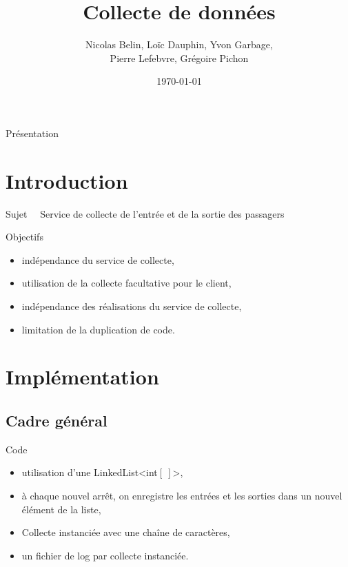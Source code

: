 \documentclass{beamer}
\title[Projet de programmation orientée objet]{Collecte de données}
\author[Les Manchots]{Nicolas Belin, Loïc Dauphin, Yvon Garbage, \\ Pierre Lefebvre, Grégoire Pichon}
\institute[ENSEIRB-MATMECA]{ENSEIRB-MATMECA}
\date{\today}
\begin{document}
\setlength{\unitlength}{1cm}

\begin{frame}{Présentation}

\titlepage

\end{frame}


\section*{Introduction}
\begin{frame}
\begin{block}{Sujet}
~~Service de collecte de l'entrée et de la sortie des passagers\\
\end{block}

\begin{block}{Objectifs}
\begin{center}
\begin{itemize}
  \item{indépendance du service de collecte,}
  \item{utilisation de la collecte facultative pour le client,}
  \item{indépendance des réalisations du service de collecte,}
  \item{limitation de la duplication de code.}
\end{itemize}
\end{center}
\end{block}
\end{frame}

\section{Implémentation}
\subsection{Cadre général}
\begin{frame}
\begin{block}{Code}
\begin{center}
\begin{itemize}
\item utilisation d'une LinkedList<int$\left[~\right]$>,
\item à chaque nouvel arrêt, on enregistre les entrées et les sorties dans un nouvel élément de la liste,
\item Collecte instanciée avec une chaîne de caractères,
\item un fichier de log par collecte instanciée.
\end{itemize}
\end{center}
\end{block}
\end{frame}
\end{document}
